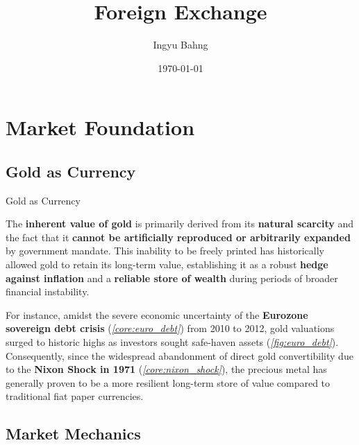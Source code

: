 \documentclass[10pt]{article}
\title{Foreign Exchange}
\date{\today}
\author{Ingyu Bahng}
\begin{document}


\section{Market Foundation}

  \subsection{Gold as Currency}

    \begin{core}{Gold as Currency}

      The \textbf{inherent value of gold} is primarily derived from its \textbf{natural scarcity} and the fact that it \textbf{cannot be artificially reproduced or arbitrarily expanded} by government mandate. This inability to be freely printed has historically allowed gold to retain its long-term value, establishing it as a robust \textbf{hedge against inflation} and a \textbf{reliable store of wealth} during periods of broader financial instability. 


      For instance, amidst the severe economic uncertainty of the \textbf{Eurozone sovereign debt crisis} (\textit{\autoref{core:euro_debt}}) from 2010 to 2012, gold valuations surged to historic highs as investors sought safe-haven assets (\textit{\autoref{fig:euro_debt}}). Consequently, since the widespread abandonment of direct gold convertibility due to the \textbf{Nixon Shock in 1971} (\textit{\autoref{core:nixon_shock}}), the precious metal has generally proven to be a more resilient long-term store of value compared to traditional fiat paper currencies.

    \end{core}

  \subsection{Market Mechanics}
\end{document}
